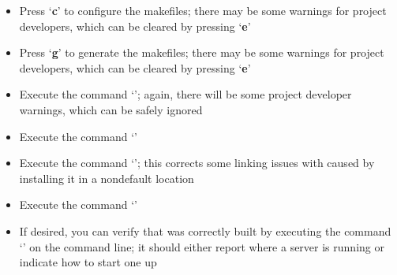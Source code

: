 \begin{itemize}
\item\exSp{}Press `\textbf{c}' to configure the makefiles; there may be some
 warnings for project developers, which can be cleared by pressing
`\textbf{e}'
\item\exSp{}Press `\textbf{g}' to generate the makefiles; there may be some 
warnings for project developers, which can be cleared by pressing `\textbf{e}'
\item\exSp{}Execute the command `'; again, there will be some project
developer warnings, which can be safely ignored
\item\exSp{}Execute the command `'
\item\exSp{}Execute the command `';
this corrects some linking issues with \yarp{} caused by installing it in a
non\longDash{}default location
\item\exSp{}Execute the command `'
\item\exSp{}If desired, you can verify that \yarp{} was correctly built by executing the
command `' on the command line; it should either report where a \yarp{}
server is running or indicate how to start one up
\end{itemize}
\tertiaryEnd
{}
